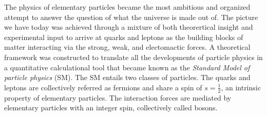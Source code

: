 
The physics of elementary particles became the most ambitious and organized attempt to answer the question of what the universe is 
made out of. 
The picture we have today was achieved through a mixture of both theorertical insight and experimental input to arrive at 
quarks and leptons as the building blocks of matter interacting via the strong, weak, and electomactic forces.
A theoretical framework was constructed to translate all the developments of particle physics in a quantitative 
calculational tool that became known as the \textit{Standard Model of particle physics} (SM). 
The SM entails two classes of particles. 
The quarks and leptons are collectively referred as fermions and
share a spin of $s=\frac{1}{2}$, an intrinsic property of elementary particles.
The interaction forces are mediated by elementary particles with an integer spin, collectively called bosons.





